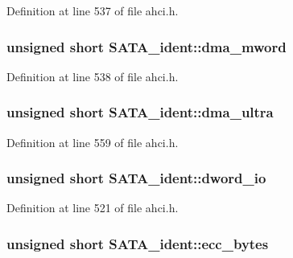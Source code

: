 Definition at line 537 of file ahci.\+h.

\subsubsection[{\texorpdfstring{dma\+\_\+mword}{dma_mword}}]{\setlength{\rightskip}{0pt plus 5cm}unsigned short S\+A\+T\+A\+\_\+ident\+::dma\+\_\+mword}\hypertarget{structSATA__ident_a3baea9abdcd9f21814c53094b1037f43}{}\label{structSATA__ident_a3baea9abdcd9f21814c53094b1037f43}


Definition at line 538 of file ahci.\+h.

\subsubsection[{\texorpdfstring{dma\+\_\+ultra}{dma_ultra}}]{\setlength{\rightskip}{0pt plus 5cm}unsigned short S\+A\+T\+A\+\_\+ident\+::dma\+\_\+ultra}\hypertarget{structSATA__ident_a16f42ed6bf33839490b8684e77801f41}{}\label{structSATA__ident_a16f42ed6bf33839490b8684e77801f41}


Definition at line 559 of file ahci.\+h.

\subsubsection[{\texorpdfstring{dword\+\_\+io}{dword_io}}]{\setlength{\rightskip}{0pt plus 5cm}unsigned short S\+A\+T\+A\+\_\+ident\+::dword\+\_\+io}\hypertarget{structSATA__ident_a7399191120ad754a14ea722897e7d29a}{}\label{structSATA__ident_a7399191120ad754a14ea722897e7d29a}


Definition at line 521 of file ahci.\+h.

\subsubsection[{\texorpdfstring{ecc\+\_\+bytes}{ecc_bytes}}]{\setlength{\rightskip}{0pt plus 5cm}unsigned short S\+A\+T\+A\+\_\+ident\+::ecc\+\_\+bytes}\hypertarget{structSATA__ident_a09bad065c4b053be42711ffd161fbed7}{}\label{structSATA__ident_a09bad065c4b053be42711ffd161fbed7}


